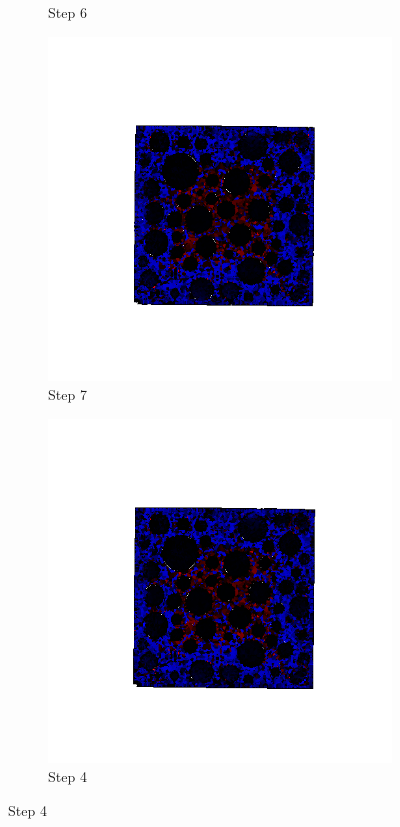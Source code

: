 \begin{figure}[ht!]
\begin{subfigure}{.25\textwidth}
      \caption{Step 6}
      \end{subfigure}%
      \begin{subfigure}{.25\textwidth}
        \centering
        \includegraphics[width=1.0\linewidth]{Files/A30X0C_3_IS/DEP50-STEP(007).png}
      \caption{Step 7}
      \end{subfigure}%
      \begin{subfigure}{.25\textwidth}
        \centering
        \includegraphics[width=1.0\linewidth]{Files/A30X0C_3_IS/DEP50-STEP(008).png}
      \caption{Step 4}
      \end{subfigure}


\end{figure}
